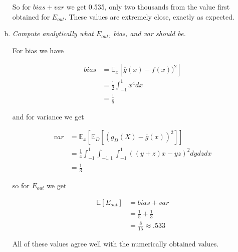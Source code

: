 \documentclass{article}
\begin{document}
\begin{enumerate}[(a)]
    So for $bias + var$ we get 0.535, only two thousands from the value first obtained for
    $E_{out}$. These values are extremely close, exactly as expected.

    \begin{center}
    \end{center}

  \item \textit{Compute analytically what $E_{out}$, bias, and var should be.}

    For bias we have

    \begin{align*}
      bias &= \mathbb{E}_x[\overline{g}(x) - f(x))^2] \\
      &= \frac{1}{2}\int_{-1}^1 x^4 dx \\
      &= \frac{1}{5}
    \end{align*}

    and for variance we get 

    \begin{align*}
      var &= \mathbb{E}_x[\mathbb{E}_D[(g_D(X) - \overline{g}(x))^2]] \\
      &= \frac{1}{4}\int_{-1}^1\int_{-1,1}\int_{-1}^1 ((y+z)x-yz)^2 dy dz dx \\
      &= \frac{1}{3}
    \end{align*}

    so for $E_{out}$ we get

    \begin{align*}
      \mathbb{E}[E_{out}] &= bias + var \\
      &= \frac{1}{5} + \frac{1}{3} \\
      &= \frac{8}{15} \approx .533
    \end{align*}

    All of these values agree well with the numerically obtained values.














\end{enumerate}
\end{document}
